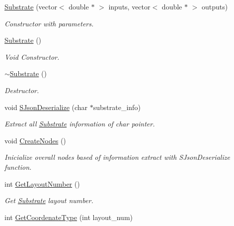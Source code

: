 \begin{DoxyCompactItemize}
\item 
\hyperlink{class_a_n_n___u_s_m_1_1_substrate_a234055fec868a53cf439fa226b1ae335}{Substrate} (vector$<$ double $\ast$ $>$ inputs, vector$<$ double $\ast$ $>$ outputs)
\begin{DoxyCompactList}\small\item\em Constructor with parameters. \end{DoxyCompactList}\item 
\hyperlink{class_a_n_n___u_s_m_1_1_substrate_a9610e9ffe4266cf149e761ca852a364f}{Substrate} ()
\begin{DoxyCompactList}\small\item\em Void Constructor. \end{DoxyCompactList}\item 
\hyperlink{class_a_n_n___u_s_m_1_1_substrate_a73ad38fceff244a55cfe6ec7ebb46581}{$\sim$\-Substrate} ()
\begin{DoxyCompactList}\small\item\em Destructor. \end{DoxyCompactList}\item 
void \hyperlink{class_a_n_n___u_s_m_1_1_substrate_a5e3ad4577e03d0c4dbb2eef576d0e6a9}{S\-Json\-Deserialize} (char $\ast$substrate\-\_\-info)
\begin{DoxyCompactList}\small\item\em Extract all \hyperlink{class_a_n_n___u_s_m_1_1_substrate}{Substrate} information of char pointer. \end{DoxyCompactList}\item 
void \hyperlink{class_a_n_n___u_s_m_1_1_substrate_a036f4445805ee1d9abf4259e9501118a}{Create\-Nodes} ()
\begin{DoxyCompactList}\small\item\em Inicialize overall nodes based of information extract with S\-Json\-Deserialize function. \end{DoxyCompactList}\item 
int \hyperlink{class_a_n_n___u_s_m_1_1_substrate_a26dee29b17f6d6284969b1697cb69414}{Get\-Layout\-Number} ()
\begin{DoxyCompactList}\small\item\em Get \hyperlink{class_a_n_n___u_s_m_1_1_substrate}{Substrate} layout number. \end{DoxyCompactList}\item 
int \hyperlink{class_a_n_n___u_s_m_1_1_substrate_a01077c74a10333c880c63e4cf2b148c0}{Get\-Coordenate\-Type} (int layout\-\_\-num)

\end{DoxyCompactItemize}
